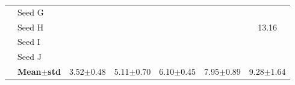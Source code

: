 \begin{table}[H]
{\begin{tabular}{@{}llccccc@{}}
 & Seed G & \cellcolor{RoyalBlue!10}{\small 3.42} & \cellcolor{RoyalBlue!10}{\small 5.03} & \cellcolor{RoyalBlue!10}{\small 6.17} & \cellcolor{RoyalBlue!10}{\small 7.95} & \cellcolor{RoyalBlue!10}{\small 9.72} \\
 & Seed H & \cellcolor{RoyalBlue!10}{\small 3.32} & \cellcolor{RoyalBlue!10}{\small 5.53} & \cellcolor{RoyalBlue!10}{\small 6.90} & \cellcolor{RoyalBlue!10}{\small 7.50} & {\small\color{gray!60!black}13.16} \\
 & Seed I & \cellcolor{RoyalBlue!10}{\small 3.71} & \cellcolor{RoyalBlue!10}{\small 4.84} & \cellcolor{RoyalBlue!10}{\small 6.82} & \cellcolor{RoyalBlue!10}{\small 7.76} & \cellcolor{RoyalBlue!10}{\small 8.12} \\
 & Seed J & \cellcolor{RoyalBlue!10}{\small 4.00} & \cellcolor{RoyalBlue!10}{\small 4.77} & \cellcolor{RoyalBlue!10}{\small 5.61} & \cellcolor{RoyalBlue!10}{\small 7.46} & \cellcolor{RoyalBlue!10}{\small 8.17} \\
 & \textbf{Mean$\pm$std} & \cellcolor{RoyalBlue!20}3.52$\pm$0.48 & \cellcolor{RoyalBlue!20}5.11$\pm$0.70 & \cellcolor{RoyalBlue!20}6.10$\pm$0.45 & \cellcolor{RoyalBlue!20}7.95$\pm$0.89 & \cellcolor{RoyalBlue!20}9.28$\pm$1.64 \\
\bottomrule
\end{tabular}
}
\end{table}


